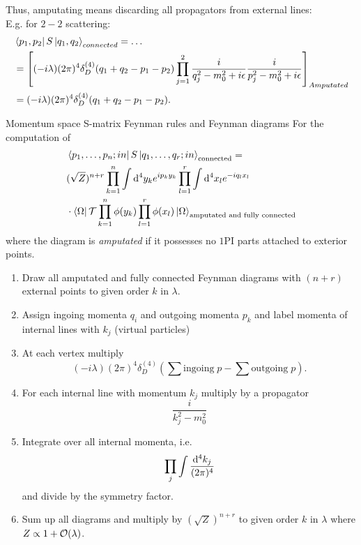 Thus, amputating means discarding all propagators from external lines:\\
E.g. for $2-2$ scattering:
\begin{align*}
	&\bra{p_1,p_2}S\ket{q_1,q_2}_{connected} = \dots \\
	&= \left[(-i \lambda) (2 \pi)^4 \delta^{(4)}_D (q_1+q_2-p_1-p_2) \prod_{j=1}^{2} \frac{i}{q^2_j-m^2_0+i\epsilon} \frac{i}{p^2_j - m^2_0 +i\epsilon}\right]_{Amputated} \\
	&= (-i \lambda) (2 \pi)^4 \delta^{(4)}_D(q_1+q_2-p_1-p_2).
\end{align*}
\begin{mybox}{Momentum space S-matrix Feynman rules and Feynman diagrams}
	For the computation of
	\begin{align*}
		&\bra{p_1,\dots,p_n;in}S\ket{q_1,\dots,q_r;in}_{\text{connected}} =\\
		&(\sqrt{Z})^{n+r} \prod_{k=1}^{n} \int \mathrm{d}^4 y_k e^{ip_k y_k} \prod_{l=1}^{r} \int \mathrm{d}^4 x_l e^{-i q_l x_l}\\
		&\cdot \bra{\Omega}\mathcal{T}\prod_{k=1}^n \phi(y_k) \prod_{l=1}^{r} \phi(x_l) \ket{\Omega}_{\text{amputated and fully connected}}
	\end{align*}
where the diagram is \emph{amputated} if it possesses no $1$PI parts attached to exterior points.
	\begin{enumerate}
		\item Draw all amputated and fully connected Feynman diagrams with $(n+r)$ external points to given order $k$ in $\lambda$.
		\item Assign ingoing momenta $q_i$ and outgoing momenta $p_k$ and label momenta of internal lines with $k_j$ (virtual particles)
		\item At each vertex multiply
		\begin{equation} 
		(-i \lambda) (2 \pi)^4 \delta^{(4)}_D(\sum\text{ingoing}\;p- \sum \text{outgoing}\;p).
		\end{equation}
		\item For each internal line with momentum $k_j$ multiply by a propagator
		\begin{equation}
			\frac{i}{k^2_j -m^2_0 }
		\end{equation}
		\item Integrate over all internal momenta, i.e. 
		\begin{equation}
			\prod_j \int \frac{\mathrm{d}^4 k_j}{(2 \pi)^4}
		\end{equation}
		and divide by the symmetry factor.
		\item Sum up all diagrams and multiply by $(\sqrt{Z})^{n+r}$ to given order $k$ in $\lambda$ where $Z\propto 1+\mathcal{O}( \lambda)$.
	\end{enumerate}
\end{mybox}
